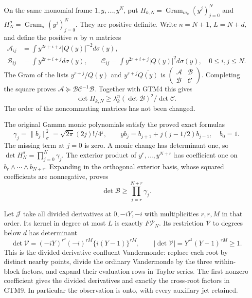 \documentclass[11pt,a4paper]{article}
\begin{document}
On the same monomial frame $1,y,\ldots,y^N$, put
$H_{k,N}=\operatorname{Gram}_{m_k}(y^j)_{j=0}^N$ and
$H_N^\sigma=\operatorname{Gram}_\sigma(y^j)_{j=0}^N$.
They are positive definite.  Write $n=N+1$, $L=N+d$, and define
the positive $n$ by $n$ matrices
\begin{equation}\tag{GTM5}
 \begin{aligned}
 \mathcal A_{ij}&=\int y^{2r+i+j}|Q(y)|^{-2}d\sigma(y),\\
 \mathcal B_{ij}&=\int y^{2r+i+j}d\sigma(y),\qquad
 \mathcal C_{ij}=\int y^{2r+i+j}|Q(y)|^2d\sigma(y),
 \quad0\le i,j\le N.
 \end{aligned}
\end{equation}
The Gram of the lists $y^{r+j}/Q(y)$ and
$y^{r+j}\overline{Q(y)}$ is
$\left(\begin{smallmatrix}\mathcal A&\mathcal B\\
\mathcal B&\mathcal C\end{smallmatrix}\right)$.
Completing the square proves
$\mathcal A\succeq\mathcal B\mathcal C^{-1}\mathcal B$.
Together with GTM4 this gives
\begin{equation}\tag{GTM6}
 \det H_{k,N}\ge\lambda_k^n
             (\det\mathcal B)^2/\det\mathcal C.
\end{equation}
The order of the noncommuting matrices has not been changed.

The original Gamma monic polynomials satisfy the proved exact formulas
\begin{equation}\tag{GTM7}
 \gamma_j=\|b_j\|_\sigma^2
   =\sqrt{2\pi}(2j)!/4^j,\qquad
 yb_j=b_{j+1}+j(j-1/2)b_{j-1},\quad b_0=1.
\end{equation}
The missing term at $j=0$ is zero.  A monic change has determinant
one, so $\det H_N^\sigma=\prod_{j=0}^N\gamma_j$.
The exterior product of $y^r,\ldots,y^{N+r}$ has coefficient one
on $b_r\wedge\cdots\wedge b_{N+r}$.  Expanding in the orthogonal
exterior basis, whose squared coefficients are nonnegative, proves
\begin{equation}\tag{GTM8}
 \det\mathcal B\ge\prod_{j=r}^{N+r}\gamma_j.
\end{equation}

Let $\mathcal J$ take all divided derivatives at
$0,-iY,-i$ with multiplicities $r,r,M$ in that order.
Its kernel in degree at most $L$ is exactly $F\mathcal P_N$.
Its restriction $\mathcal V$ to degrees below $d$ has determinant
\begin{equation}\tag{GTM9}
 \det\mathcal V=(-iY)^{r^2}(-i)^{rM}\{i(Y-1)\}^{rM},
 \qquad |\det\mathcal V|=Y^{r^2}(Y-1)^{rM}\ge1.
\end{equation}
This is the divided-derivative confluent Vandermonde: replace each
root by distinct nearby points, divide the ordinary Vandermonde by
the three within-block factors, and expand their evaluation rows in
Taylor series.  The first nonzero coefficient gives the divided
derivatives and exactly the cross-root factors in GTM9.  In particular
the observation is onto, with every auxiliary jet retained.
\end{document}
